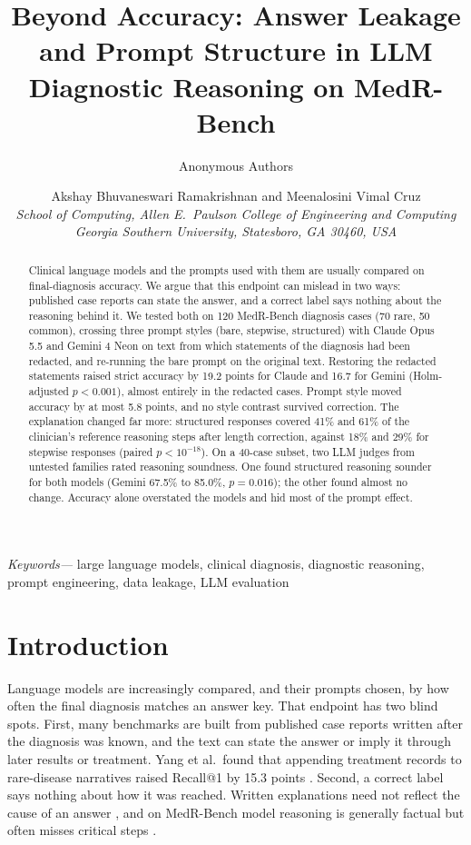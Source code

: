 \IfFileExists{IEEEtran.cls}{\ieeetrue\documentclass[conference]{IEEEtran}}{\ieeefalse\documentclass[10pt,twocolumn,letterpaper]{article}}
\date{}
\providecommand{\IEEEauthorblockN}[1]{\large #1\\[3pt]}
\providecommand{\IEEEauthorblockA}[1]{\normalsize\itshape #1}
\newenvironment{IEEEkeywords}{\noindent\textit{Keywords---}}{\par}
\begin{document}
\title{Beyond Accuracy: Answer Leakage and Prompt Structure in LLM Diagnostic Reasoning on MedR-Bench}
\ifanon
  \author{\IEEEauthorblockN{Anonymous Authors}}
\else
  \author{\IEEEauthorblockN{Akshay Bhuvaneswari Ramakrishnan and Meenalosini Vimal Cruz}
  \IEEEauthorblockA{School of Computing, Allen E.\ Paulson College of Engineering and Computing\\
  Georgia Southern University, Statesboro, GA 30460, USA}}
\fi
\maketitle
\ifieee\else\thispagestyle{empty}\fi

\begin{abstract}
Clinical language models and the prompts used with them are usually compared on final-diagnosis accuracy. We argue that this endpoint can mislead in two ways: published case reports can state the answer, and a correct label says nothing about the reasoning behind it. We tested both on 120 MedR-Bench diagnosis cases (70 rare, 50 common), crossing three prompt styles (bare, stepwise, structured) with Claude Opus 5.5 and Gemini 4 Neon on text from which statements of the diagnosis had been redacted, and re-running the bare prompt on the original text. Restoring the redacted statements raised strict accuracy by 19.2 points for Claude and 16.7 for Gemini (Holm-adjusted $p<0.001$), almost entirely in the redacted cases. Prompt style moved accuracy by at most 5.8 points, and no style contrast survived correction. The explanation changed far more: structured responses covered 41\% and 61\% of the clinician's reference reasoning steps after length correction, against 18\% and 29\% for stepwise responses (paired $p<10^{-18}$). On a 40-case subset, two LLM judges from untested families rated reasoning soundness. One found structured reasoning sounder for both models (Gemini 67.5\% to 85.0\%, $p=0.016$); the other found almost no change. Accuracy alone overstated the models and hid most of the prompt effect.
\end{abstract}
\begin{IEEEkeywords}
large language models, clinical diagnosis, diagnostic reasoning, prompt engineering, data leakage, LLM evaluation
\end{IEEEkeywords}

\section{Introduction}
Language models are increasingly compared, and their prompts chosen, by how often the final diagnosis matches an answer key. That endpoint has two blind spots. First, many benchmarks are built from published case reports written after the diagnosis was known, and the text can state the answer or imply it through later results or treatment. Yang et al.\ found that appending treatment records to rare-disease narratives raised Recall@1 by 15.3 points \cite{yang2026}. Second, a correct label says nothing about how it was reached. Written explanations need not reflect the cause of an answer \cite{turpin2023}, and on MedR-Bench model reasoning is generally factual but often misses critical steps \cite{qiu2025}.
\end{document}
